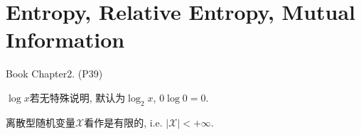 \chapter{Entropy, Relative Entropy, Mutual Information}
Book Chapter2. (P39)

$\log x$若无特殊说明, 默认为$\log_2 x$, $0\log 0=0$.

离散型随机变量$\mathcal{X}$看作是有限的, i.e. $|\mathcal{X}|<+\infty$.





